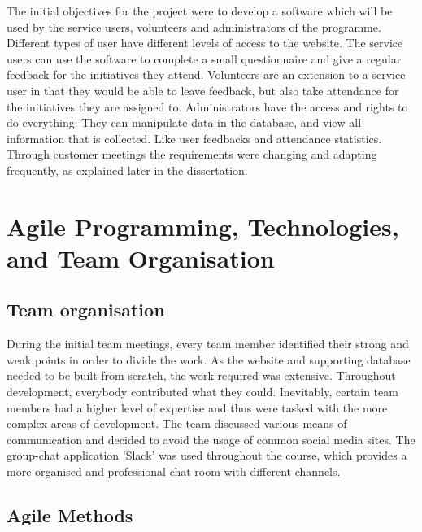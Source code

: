 \documentclass{l3proj}
\begin{document}
The initial objectives for the project were to develop a software which will be used by the service users, volunteers and administrators of the programme. Different types of user have different levels of access to the website. The service users can use the software to complete a small questionnaire and give a regular feedback for the initiatives they attend. Volunteers are an extension to a service user in that they would be able to leave feedback, but also take attendance for the initiatives they are assigned to. Administrators have the access and rights to do everything. They can manipulate data in the database, and view all information that is collected. Like user feedbacks and attendance statistics. Through customer meetings the requirements were changing and adapting frequently, as explained later in the dissertation.

\section{Agile Programming, Technologies, and Team Organisation}

\subsection{Team organisation}
\label{sec:organisation}

During the initial team meetings, every team member identified their strong and weak points in order to divide the work. As the website and supporting database needed to be built from scratch, the work required was extensive. Throughout development, everybody contributed what they could. Inevitably, certain team members had a higher level of expertise and thus were tasked with the more complex areas of development. The team discussed various means of communication and decided to avoid the usage of common social media sites. The group-chat application 'Slack' was used throughout the course, which provides a more organised and professional chat room with different channels.

\subsection{Agile Methods}
\label{sec:agile}
\end{document}
